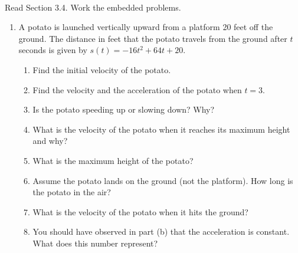 \documentclass[11pt,fleqn]{article}
\begin{document}
\renewcommand{\headrulewidth}{0pt}
\newcommand{\blank}[1]{\rule{#1}{0.75pt}}
\newcommand{\bc}{\begin{center}}
\newcommand{\ec}{\end{center}}
\renewcommand{\d}{\displaystyle}

\vspace*{-0.7in}

\begin{center}
  \large
  \\
\end{center}
Read Section 3.4. Work the embedded problems. \\
\begin{enumerate}
\item A potato is launched vertically upward from a platform 20 feet off the ground. The distance in feet that the potato travels from the ground after $t$ seconds is given by $s(t)=-16t^2+64t+20.$
	\begin{enumerate}
	\item Find the initial velocity of the potato.
	\vfill
	\item Find the velocity and the acceleration of the potato when $t=3.$ 	\vfill
	\item Is the potato speeding up or slowing down? Why?
	\vfill
	\item What is the velocity of the potato when it reaches its maximum height and why?
	\vfill
	\item What is the maximum height of the potato?
	\vfill
	\item Assume the potato lands on the ground (not the platform). How long is the potato in the air?
	\vfill
	\item What is the velocity of the potato when it hits the ground?
	\vfill
	\item You should have observed in part (b) that the acceleration is constant. What does this number represent? 
	\vfill
	\end{enumerate}
\end{enumerate}
\end{document}
